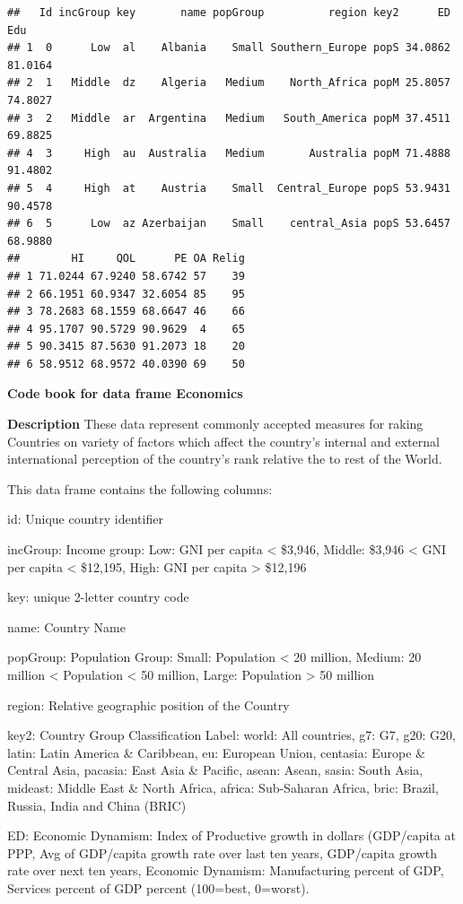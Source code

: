 \documentclass[
]{book}
\begin{document}
\begin{verbatim}
##   Id incGroup key       name popGroup          region key2      ED     Edu
## 1  0      Low  al    Albania    Small Southern_Europe popS 34.0862 81.0164
## 2  1   Middle  dz    Algeria   Medium    North_Africa popM 25.8057 74.8027
## 3  2   Middle  ar  Argentina   Medium   South_America popM 37.4511 69.8825
## 4  3     High  au  Australia   Medium       Australia popM 71.4888 91.4802
## 5  4     High  at    Austria    Small  Central_Europe popS 53.9431 90.4578
## 6  5      Low  az Azerbaijan    Small    central_Asia popS 53.6457 68.9880
##        HI     QOL      PE OA Relig
## 1 71.0244 67.9240 58.6742 57    39
## 2 66.1951 60.9347 32.6054 85    95
## 3 78.2683 68.1559 68.6647 46    66
## 4 95.1707 90.5729 90.9629  4    65
## 5 90.3415 87.5630 91.2073 18    20
## 6 58.9512 68.9572 40.0390 69    50
\end{verbatim}

\textbf{Code book for data frame Economics}

\textbf{Description}
These data represent commonly accepted measures for raking Countries on variety of factors which affect the country's internal and external international perception of the country's rank relative the to rest of the World.

This data frame contains the following columns:

id: Unique country identifier

incGroup: Income group: Low: GNI per capita \textless{} \$3,946, Middle: \$3,946 \textless{} GNI per capita \textless{} \$12,195, High: GNI per capita \textgreater{} \$12,196

key: unique 2-letter country code

name: Country Name

popGroup: Population Group: Small: Population \textless{} 20 million, Medium: 20 million \textless{} Population \textless{} 50 million, Large: Population \textgreater{} 50 million

region: Relative geographic position of the Country

key2: Country Group Classification Label: world: All countries, g7: G7, g20: G20, latin: Latin America \& Caribbean, eu: European Union, centasia: Europe \& Central Asia, pacasia: East Asia \& Pacific, asean: Asean, sasia: South Asia, mideast: Middle East \& North Africa, africa: Sub-Saharan Africa, bric: Brazil, Russia, India and China (BRIC)

ED: Economic Dynamism: Index of Productive growth in dollars (GDP/capita at PPP, Avg of GDP/capita growth rate over last ten years, GDP/capita growth rate over next ten years, Economic Dynamism: Manufacturing percent of GDP, Services percent of GDP percent (100=best, 0=worst).
\end{document}
